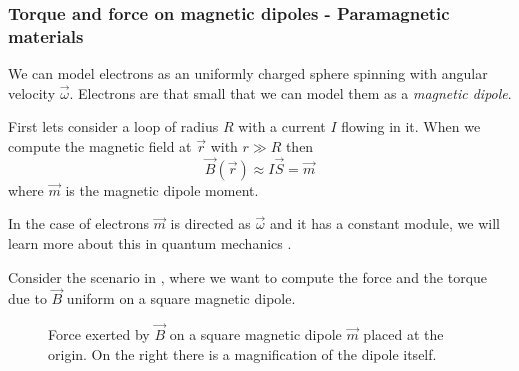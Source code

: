 \documentclass[12pt]{extarticle}
\begin{document}
\subsubsection{Torque and force on magnetic dipoles - Paramagnetic materials}

We can model electrons as an uniformly charged sphere spinning with angular velocity $\vec \omega$.
Electrons are that small that we can model them as a \emph{magnetic dipole}.

First lets consider a loop of radius $R$ with a current $I$ flowing in it.
When we compute the magnetic field at $\vec r$ with $r \gg R$ then
\begin{equation}
	\vec B(\vec r) \approx I \vec S = \vec m
\end{equation}
where $\vec m$ is the magnetic dipole moment.

In the case of electrons $\vec m$ is directed as $\vec \omega$ and it has a constant module,
we will learn more about this in quantum mechanics .

Consider the scenario in , where we want to compute the force and the torque due to $\vec B$ uniform on
a square magnetic dipole.
\begin{figure}[H]
	\centering
	
	\caption{Force exerted by $\vec B$ on a square magnetic dipole $\vec m$ placed at the origin.
		On the right there is a magnification of the dipole itself.}
	\label{fig:mag-dipole}
\end{figure}
\end{document}
